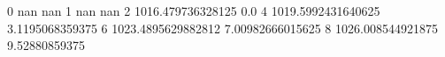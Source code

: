 0 nan nan
1 nan nan
2 1016.479736328125 0.0
4 1019.5992431640625 3.1195068359375
6 1023.4895629882812 7.00982666015625
8 1026.008544921875 9.52880859375
